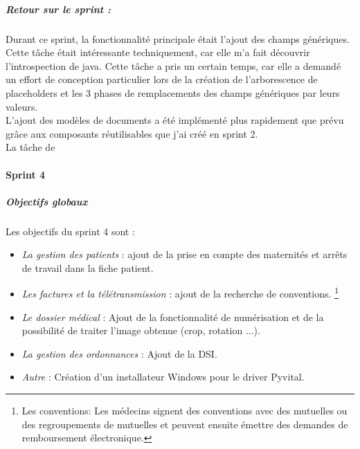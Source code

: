 \subparagraph{Retour sur le sprint :}
Durant ce sprint, la fonctionnalité principale était l'ajout des champs génériques. Cette tâche était intéressante techniquement, car elle m'a fait découvrir l'introspection de java. Cette tâche a pris un certain temps, car elle a demandé un effort de conception particulier lors de la création de l'arborescence de placeholders et les 3 phases de remplacements des champs génériques par leurs valeurs.  \\
L'ajout des modèles de documents a été implémenté plus rapidement que prévu grâce aux composants réutilisables que j'ai créé en sprint 2.\\
La tâche de 

\newpage
\paragraph*{Sprint 4}
\subparagraph{Objectifs globaux}

Les objectifs du sprint 4 sont : 
\begin{itemize}
\item \textit{La gestion des patients} : ajout  de la prise en compte des maternités et arrêts de travail dans la fiche patient.

\item \textit{Les factures et la télétransmission} : ajout de la recherche de conventions. \footnote{Les conventions: Les médecins signent des conventions avec des mutuelles ou des regroupements de mutuelles et peuvent ensuite émettre des demandes de remboursement électronique.} 

\item \textit{Le dossier médical} : Ajout de la fonctionnalité de numérisation et de la possibilité de traiter l'image obtenue (crop, rotation ...).

\item \textit{La gestion des ordonnances} : Ajout de la \gls{DSI}.

\item \textit{Autre} : Création d'un installateur Windows pour le driver Pyvital. 
\end{itemize} 

